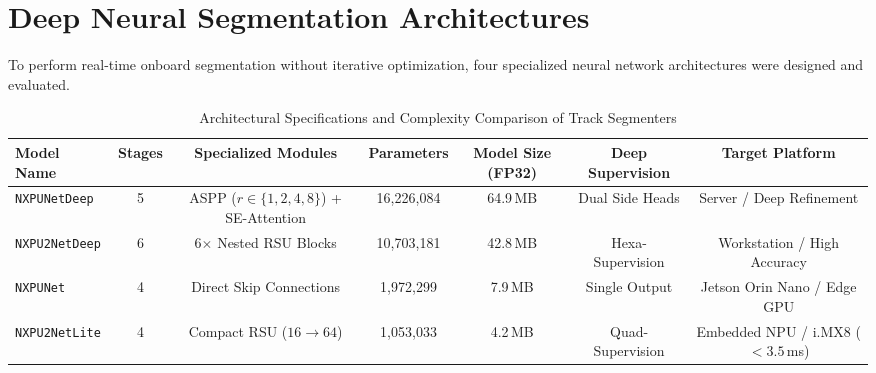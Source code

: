 \documentclass[10pt,journal,compsoc]{IEEEtran}
\begin{document}
\section{Deep Neural Segmentation Architectures}
To perform real-time onboard segmentation without iterative optimization, four specialized neural network architectures were designed and evaluated.

\begin{table}[t]
\caption{Architectural Specifications and Complexity Comparison of Track Segmenters}
\label{tab:architectures}
\centering
\begin{tabular}{lcccccc}
\toprule
\textbf{Model Name} & \textbf{Stages} & \textbf{Specialized Modules} & \textbf{Parameters} & \textbf{Model Size (FP32)} & \textbf{Deep Supervision} & \textbf{Target Platform} \\
\midrule
\texttt{NXPUNetDeep} & 5 & ASPP ($r \in \{1,2,4,8\}$) + SE-Attention & 16,226,084 & 64.9\,MB & Dual Side Heads & Server / Deep Refinement \\
\texttt{NXPU2NetDeep} & 6 & 6$\times$ Nested RSU Blocks & 10,703,181 & 42.8\,MB & Hexa-Supervision & Workstation / High Accuracy \\
\texttt{NXPUNet} & 4 & Direct Skip Connections & 1,972,299 & 7.9\,MB & Single Output & Jetson Orin Nano / Edge GPU \\
\texttt{NXPU2NetLite} & 4 & Compact RSU ($16\to 64$) & 1,053,033 & 4.2\,MB & Quad-Supervision & Embedded NPU / i.MX8 ($<3.5$\,ms) \\
\bottomrule
\end{tabular}
\end{table}
\end{document}
